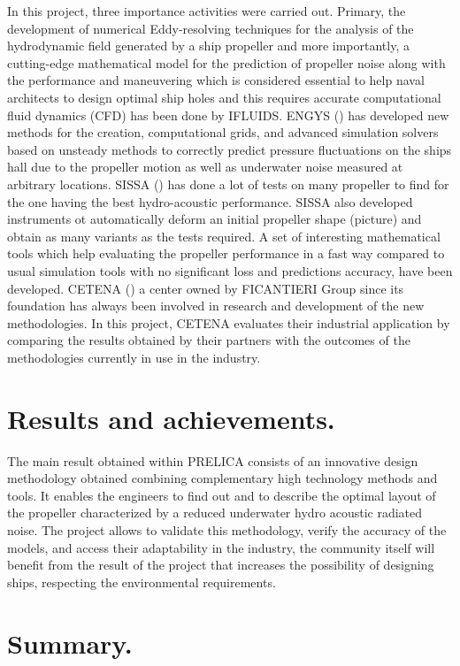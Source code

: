 \documentclass[10pt,a4paper,twoside]{article}
\begin{document}
In this project, three importance activities were carried out. Primary, the development of numerical Eddy-resolving techniques for the analysis of the hydrodynamic field generated by a ship propeller and more importantly, a cutting-edge mathematical model for the prediction of propeller noise along with the performance and maneuvering which is considered essential to help naval architects to design optimal ship holes and this requires accurate computational fluid dynamics (CFD) has been done by IFLUIDS. ENGYS () has developed new methods for the creation, computational grids, and advanced simulation solvers based on unsteady methods to correctly predict pressure fluctuations on the ships hall due to the propeller motion as well as underwater noise measured at arbitrary locations. SISSA () has done a lot of tests on many propeller to find for the one having the best hydro-acoustic performance. SISSA also developed instruments ot automatically deform an initial propeller shape (picture) and obtain as many variants as the tests required. A set of interesting mathematical tools which help evaluating the propeller performance in a fast way compared to usual simulation tools with no significant loss and predictions accuracy, have been developed. CETENA () a center owned by FICANTIERI Group since its foundation has always been involved in research and development of the new methodologies. In this project, CETENA evaluates their industrial application by comparing the results obtained by their partners with the outcomes of the methodologies currently in use in the industry. 

\section{Results and achievements.}

The main result obtained within PRELICA consists of an innovative design methodology obtained combining complementary high technology methods and tools.  It enables the engineers to find out and to describe the optimal layout of the propeller characterized by a reduced underwater hydro acoustic radiated noise. The project allows to validate this methodology, verify the accuracy of the models, and access their adaptability in the industry, the community itself will benefit from the result of the project that increases the possibility of designing ships, respecting the environmental requirements.


\section{Summary.}
\end{document}
